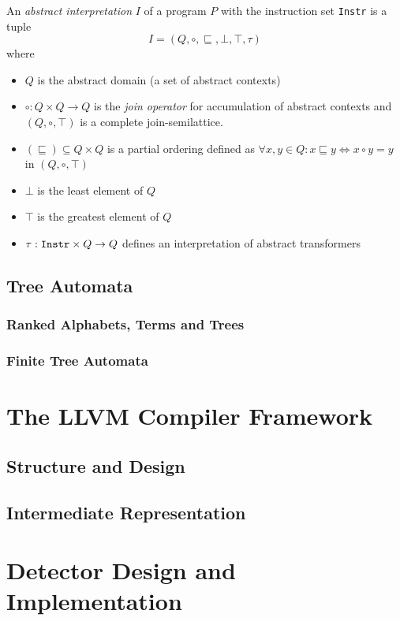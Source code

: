 \begin{defn}
An \emph{abstract interpretation} $I$ of a program $P$ with the instruction set \texttt{Instr} is a tuple $$I = (Q, \circ, \sqsubseteq, \bot, \top, \tau)$$ where
\begin{itemize}
    \item $Q$ is the abstract domain (a set of abstract contexts)
    \item $\circ: Q \times Q \rightarrow Q$ is the \emph{join operator} for accumulation of abstract contexts and $(Q, \circ, \top)$ is a complete join-semilattice.
    \item $(\sqsubseteq) \subseteq Q \times Q$ is a partial ordering defined as $\forall x, y \in Q: x \sqsubseteq y \Leftrightarrow x \circ y = y$ in $(Q,\circ, \top)$
    \item $\bot$ is the least element of $Q$
    \item $\top$ is the greatest element of $Q$
    \item $\tau: \text{\texttt{Instr}}\times Q \rightarrow Q$ defines an interpretation of abstract transformers
\end{itemize}
\end{defn}
\section{Tree Automata}
\subsection{Ranked Alphabets, Terms and Trees}
\subsection{Finite Tree Automata}
\chapter{The LLVM Compiler Framework}
\label{ch_llvm}
    \section{Structure and Design}
    \section{Intermediate Representation}
\chapter{Detector Design and Implementation}
\label{ch_detector}
